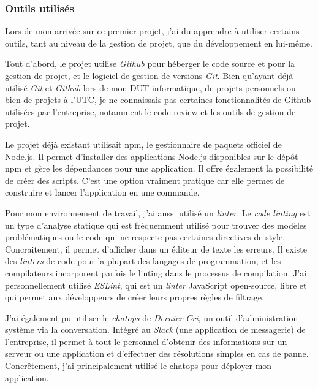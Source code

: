 \bigskip

\subsubsection{Outils utilisés}\label{outils-utilisuxe9s}

\bigskip

Lors de mon arrivée sur ce premier projet, j'ai du apprendre à utiliser
certains outils, tant au niveau de la gestion de projet, que du
développement en lui-même.

\bigskip

Tout d'abord, le projet utilise \emph{Github} pour héberger le code
source et pour la gestion de projet, et le logiciel de gestion de
versions \emph{Git}. Bien qu'ayant déjà utilisé \emph{Git} et
\emph{Github} lors de mon DUT informatique, de projets personnels ou
bien de projets à l'UTC, je ne connaissais pas certaines fonctionnalités
de Github utilisées par l'entreprise, notamment le code review et les
outils de gestion de projet.

\bigskip

Le projet déjà existant utilisait npm, le gestionnaire de paquets
officiel de Node.js. Il permet d'installer des applications Node.js
disponibles sur le dépôt npm et gère les dépendances pour une
application. Il offre également la possibilité de créer des scripts.
C'est une option vraiment pratique car elle permet de construire et
lancer l'application en une commande.

\bigskip

Pour mon environnement de travail, j'ai aussi utilisé un \emph{linter}.
Le \emph{code linting} est un type d'analyse statique qui est
fréquemment utilisé pour trouver des modèles problématiques ou le code
qui ne respecte pas certaines directives de style. Concraitement, il
permet d'afficher dans un éditeur de texte les erreurs. Il existe des
\emph{linters} de code pour la plupart des langages de programmation, et
les compilateurs incorporent parfois le linting dans le processus de
compilation. J'ai personnellement utilisé \emph{ESLint}, qui est un
\emph{linter} JavaScript open-source, libre et qui permet aux
développeurs de créer leurs propres règles de filtrage.

\bigskip

J'ai également pu utiliser le \emph{chatops} de \emph{Dernier Cri}, un
outil d'administration système via la conversation. Intégré au
\emph{Slack} (une application de messagerie) de l'entreprise, il permet
à tout le personnel d'obtenir des informations sur un serveur ou une
application et d'effectuer des résolutions simples en cas de panne.
Concrêtement, j'ai principalement utilisé le chatops pour déployer mon
application.

